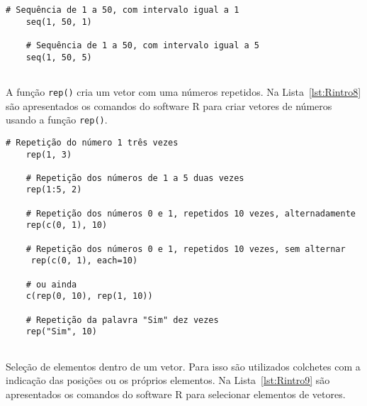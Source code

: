 \documentclass[11pt,fleqn]{book} %
\begin{document}
\begin{scriptsize}
	\estiloR
	\begin{lstlisting}[caption={Comandos do software R}, label=lst:Rintro7]
	# Sequência de 1 a 50, com intervalo igual a 1
	seq(1, 50, 1)
	
	# Sequência de 1 a 50, com intervalo igual a 5
	seq(1, 50, 5)
	
	\end{lstlisting}
\end{scriptsize}


A função \texttt{rep()} cria um vetor com uma números repetidos. Na Lista~\ref{lst:Rintro8} são apresentados os comandos do software R para criar vetores de números usando a função \texttt{rep()}. \\

\begin{scriptsize}
	\estiloR
	\begin{lstlisting}[caption={Comandos do software R}, label=lst:Rintro8]
	# Repetição do número 1 três vezes
	rep(1, 3)
	
	# Repetição dos números de 1 a 5 duas vezes
	rep(1:5, 2)
	
	# Repetição dos números 0 e 1, repetidos 10 vezes, alternadamente
	rep(c(0, 1), 10)
	
	# Repetição dos números 0 e 1, repetidos 10 vezes, sem alternar
	 rep(c(0, 1), each=10)
	
	# ou ainda
	c(rep(0, 10), rep(1, 10))
	
	# Repetição da palavra "Sim" dez vezes
	rep("Sim", 10)	
	
	\end{lstlisting}
\end{scriptsize}


Seleção de elementos dentro de um vetor. Para isso são utilizados colchetes com a indicação das posições ou os próprios elementos. Na Lista~\ref{lst:Rintro9} são apresentados os comandos do software R para selecionar elementos de vetores. \\
\end{document}
